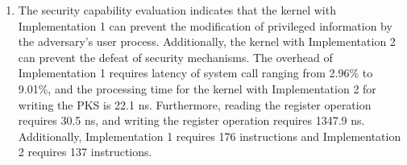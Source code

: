 \begin{enumerate}
  \item 
The security capability evaluation indicates that the kernel with Implementation
1 can prevent the modification of privileged information by the adversary's user
process. Additionally, the kernel with Implementation 2 can prevent the defeat
of security mechanisms.
%
The overhead of Implementation 1 requires latency of system call ranging from
2.96\% to 9.01\%, 
and the processing time for the kernel with Implementation 2 for writing the PKS
is 22.1 ns. Furthermore, reading the register operation requires 30.5 ns, and
writing the register operation requires 1347.9 ns.
%
Additionally, Implementation 1 requires 176 instructions and Implementation 2
requires 137 instructions.


\end{enumerate}
  


  


